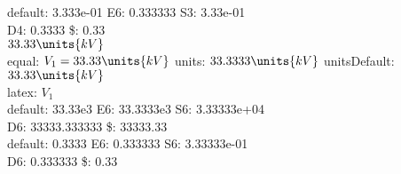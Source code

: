 
default: 3.333e-01 E6: 0.333333 S3: 3.33e-01\\
D4: 0.3333 \$: 0.33\\

\mbox{$33.33 \units{k V}$} \\
equal: \mbox{$V_{1}=\mbox{$33.33 \units{k V}$}$} units: \mbox{$33.3333 \units{k V}$} unitsDefault: \mbox{$33.33 \units{k V}$}\\
latex: \mbox{$V_{1}$}\\

default: 33.33e3 E6: 33.3333e3 S6: 3.33333e+04\\
D6: 33333.333333 \$: 33333.33\\

default: 0.3333 E6: 0.333333 S6: 3.33333e-01\\
D6: 0.333333 \$: 0.33\\

